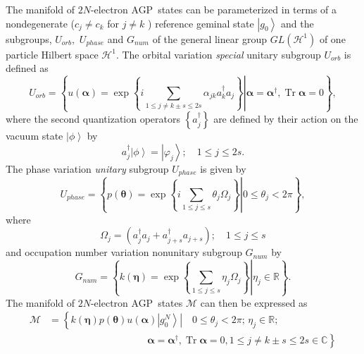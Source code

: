 \documentclass[titlepage]{article}%
\begin{document}
The manifold of $2N$-electron AGP\ states can be parameterized in terms of a
nondegenerate ($c_{j}\neq c_{k}$ for $j\neq k$ ) reference geminal state
$\left\vert g_{0}\right\rangle $ and the subgroups, $U_{orb},$ $U_{phase}$ and
$G_{num}$ of the general linear group $GL\left(  \mathcal{H}^{1}\right)  $ of
one particle Hilbert space $\mathcal{H}^{1}$. The orbital variation
\emph{special} unitary subgroup $U_{orb}$ is defined as
\begin{equation}
U_{orb}=\left\{  \left.  u\left(  \bm{\alpha}\right)  =\exp\left\{
i\sum_{1\leq j\neq k\pm s\leq2s}\alpha_{jk}a_{k}^{\dagger}a_{j}\right\}
\right\vert \bm{\alpha}=\bm{\alpha}^{\dagger},\operatorname{Tr}%
\bm{\alpha}=0\right\}  , \label{orb}%
\end{equation}
where the second quantization operators $\left\{  a_{j}^{\dagger}\right\}  $
are defined by their action on the vacuum state $\left\vert \phi\right\rangle
$ by
\begin{equation}
a_{j}^{\dagger}\left\vert \phi\right\rangle =\left\vert \varphi_{j}%
\right\rangle ;\quad1\leq j\leq2s.
\end{equation}
The phase variation \emph{unitary} subgroup $U_{phase}$ is given by%
\begin{equation}
U_{phase}=\left\{  \left.  p\left(  \bm{\theta}\right)  =\exp\left\{
i\sum_{1\leq j\leq s}\theta_{j}\Omega_{j}\right\}  \right\vert 0\leq\theta
_{j}<2\pi\right\}  , \label{phase}%
\end{equation}
where
\begin{equation}
\Omega_{j}=\left(  a_{j}^{\dagger}a_{j}+a_{j+s}^{\dagger}a_{j+s}\right)
;\quad1\leq j\leq s
\end{equation}
and occupation number variation nonunitary subgroup $G_{num}$ by
\begin{equation}
G_{num}=\left\{  \left.  k\left(  \bm{\eta}\right)  =\exp\left\{  \sum_{1\leq
j\leq s}\eta_{j}\Omega_{j}\right\}  \right\vert \eta_{j}\in\mathbb{R}\right\}
. \label{occup}%
\end{equation}
The manifold of $2N$-electron AGP\ states $\mathcal{M}$ can then be expressed
as
\begin{align}
\mathcal{M}  &  \mathcal{=}\left\{  \left.  \overset{}{k\left(
\bm{\eta}\right)  p\left(  \bm{\theta}\right)  u\left(  \bm{\alpha}\right)
}\left\vert g_{0}^{N}\right\rangle \right\vert \quad0\leq\theta_{j}%
<2\pi;\,\eta_{j}\in\mathbb{R};\right. \nonumber\\
&  \qquad\qquad\qquad\qquad\qquad\left.  \bm{\alpha}=\bm{\alpha }^{\dagger
},\operatorname{Tr}\bm{\alpha}=0,1\leq j\neq k\pm s\leq2s\in\mathbb{C}%
\right\}
\end{align}
\end{document}
